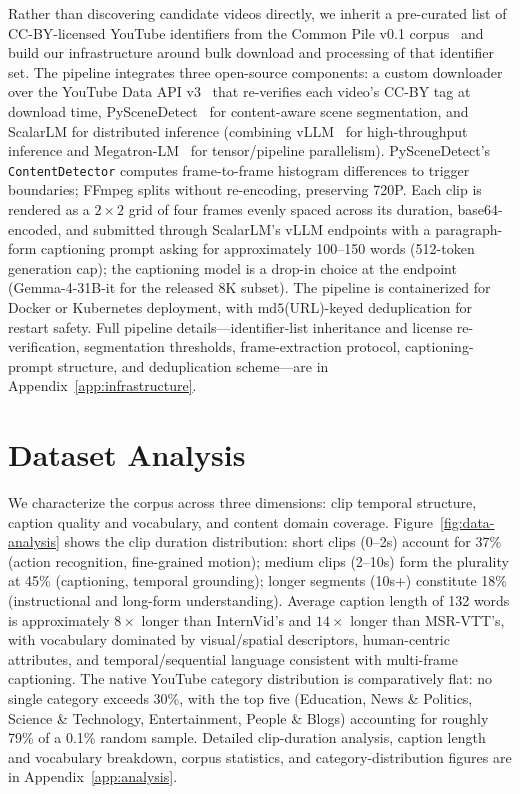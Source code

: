 \documentclass{article}
\begin{document}
Rather than discovering candidate videos directly, we inherit a pre-curated list of CC-BY-licensed YouTube identifiers from the Common Pile v0.1 corpus~\cite{kandpal2025commonpile} and build our infrastructure around bulk download and processing of that identifier set. The pipeline integrates three open-source components: a custom downloader over the YouTube Data API v3~\cite{internet_archive_api} that re-verifies each video's CC-BY tag at download time, PySceneDetect~\cite{castellano2014pyscenedetect} for content-aware scene segmentation, and ScalarLM for distributed inference (combining vLLM~\cite{kwon2023efficient} for high-throughput inference and Megatron-LM~\cite{shoeybi2019megatron, narayanan2021efficient} for tensor/pipeline parallelism). PySceneDetect's \texttt{ContentDetector} computes frame-to-frame histogram differences to trigger boundaries; FFmpeg splits without re-encoding, preserving 720P. Each clip is rendered as a $2 \times 2$ grid of four frames evenly spaced across its duration, base64-encoded, and submitted through ScalarLM's vLLM endpoints with a paragraph-form captioning prompt asking for approximately 100--150 words (512-token generation cap); the captioning model is a drop-in choice at the endpoint (Gemma-4-31B-it for the released 8K subset). The pipeline is containerized for Docker or Kubernetes deployment, with $\mathrm{md5}$(URL)-keyed deduplication for restart safety. Full pipeline details---identifier-list inheritance and license re-verification, segmentation thresholds, frame-extraction protocol, captioning-prompt structure, and deduplication scheme---are in Appendix~\ref{app:infrastructure}.

\section{Dataset Analysis}
\label{sec:analysis}

We characterize the corpus across three dimensions: clip temporal structure, caption quality and vocabulary, and content domain coverage. Figure~\ref{fig:data-analysis} shows the clip duration distribution: short clips (0--2s) account for 37\% (action recognition, fine-grained motion); medium clips (2--10s) form the plurality at 45\% (captioning, temporal grounding); longer segments (10s+) constitute 18\% (instructional and long-form understanding). Average caption length of 132 words is approximately $8\times$ longer than InternVid's and $14\times$ longer than MSR-VTT's, with vocabulary dominated by visual/spatial descriptors, human-centric attributes, and temporal/sequential language consistent with multi-frame captioning. The native YouTube category distribution is comparatively flat: no single category exceeds 30\%, with the top five (Education, News \& Politics, Science \& Technology, Entertainment, People \& Blogs) accounting for roughly 79\% of a 0.1\% random sample. Detailed clip-duration analysis, caption length and vocabulary breakdown, corpus statistics, and category-distribution figures are in Appendix~\ref{app:analysis}.
\end{document}
